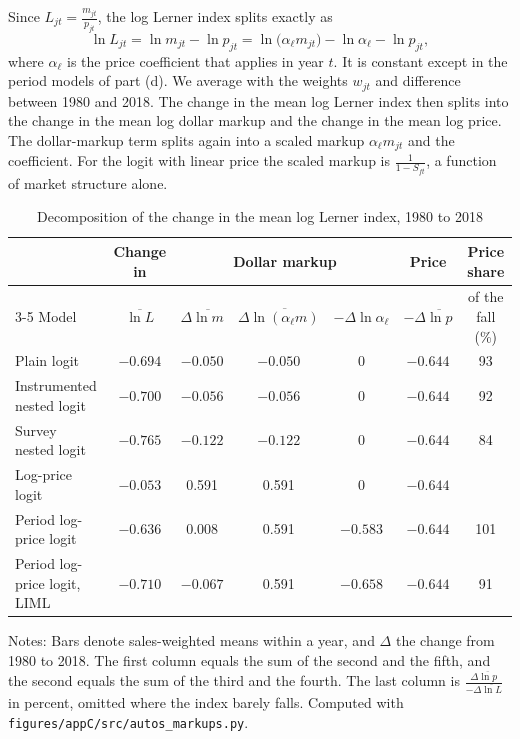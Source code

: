 Since $L_{jt} = \frac{m_{jt}}{p_{jt}}$, the log Lerner index splits exactly as
\begin{equation}\label{eq:C-lerner-decomp}
  \ln L_{jt} = \ln m_{jt} - \ln p_{jt} = \ln\big(\alpha_\ell m_{jt}\big) - \ln\alpha_\ell - \ln p_{jt} ,
\end{equation}
where $\alpha_\ell$ is the price coefficient that applies in year $t$. It is constant except in the period models of
part (d). We average with the weights $w_{jt}$ and difference between 1980 and 2018. The change in the mean log Lerner index
then splits into the change in the mean log dollar markup and the change in the mean log price. The dollar-markup term
splits again into a scaled markup $\alpha_\ell m_{jt}$ and the coefficient. For the logit with linear price the scaled
markup is $\frac{1}{1 - S_{ft}}$, a function of market structure alone.

\begin{table}[htbp]
\centering
\caption{Decomposition of the change in the mean log Lerner index, 1980 to 2018}
\label{tab:C-autos-decomp}
\footnotesize
\setlength{\tabcolsep}{4pt}
\begin{tabular}{@{}lcccccc@{}}
\toprule
 & Change in & \multicolumn{3}{c}{Dollar markup} & Price & Price share \\
\cmidrule(lr){3-5}
Model & $\overline{\ln L}$ & $\Delta\overline{\ln m}$ & $\Delta\overline{\ln(\alpha_\ell m)}$ & $-\Delta\ln\alpha_\ell$ &
$-\Delta\overline{\ln p}$ & of the fall (\%) \\
\midrule
Plain logit & $-0.694$ & $-0.050$ & $-0.050$ & 0 & $-0.644$ & 93 \\
Instrumented nested logit & $-0.700$ & $-0.056$ & $-0.056$ & 0 & $-0.644$ & 92 \\
Survey nested logit & $-0.765$ & $-0.122$ & $-0.122$ & 0 & $-0.644$ & 84 \\
Log-price logit & $-0.053$ & 0.591 & 0.591 & 0 & $-0.644$ & \\
Period log-price logit & $-0.636$ & 0.008 & 0.591 & $-0.583$ & $-0.644$ & 101 \\
Period log-price logit, LIML & $-0.710$ & $-0.067$ & 0.591 & $-0.658$ & $-0.644$ & 91 \\
\bottomrule
\end{tabular}

\vspace{3pt}
\begin{minipage}{0.97\textwidth}
\footnotesize Notes: Bars denote sales-weighted means within a year, and $\Delta$ the change from 1980 to 2018. The
first column equals the sum of the second and the fifth, and the second equals the sum of the third and the fourth. The
last column is $\frac{\Delta\overline{\ln p}}{-\Delta\overline{\ln L}}$ in percent, omitted where the index barely falls.
Computed with \texttt{figures/appC/src/autos\_markups.py}.
\end{minipage}
\end{table}

